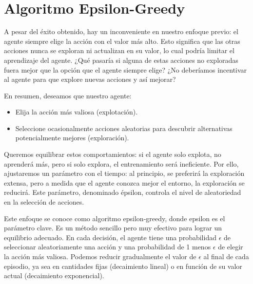 \documentclass{article}
\begin{document}
\vspace{1cm}

\section{Algoritmo Epsilon-Greedy}

\vspace{1cm}

A pesar del éxito obtenido, hay un inconveniente en nuestro enfoque previo: el agente siempre elige la acción con el valor más alto. Esto significa que las otras acciones nunca se exploran ni actualizan en su valor, lo cual podría limitar el aprendizaje del agente. ¿Qué pasaría si alguna de estas acciones no exploradas fuera mejor que la opción que el agente siempre elige? ¿No deberíamos incentivar al agente para que explore nuevas acciones y así mejorar?

\vspace{0.5cm}

En resumen, deseamos que nuestro agente:

\begin{itemize}
    \item Elija la acción más valiosa (explotación).
    \item Seleccione ocasionalmente acciones aleatorias para descubrir alternativas potencialmente mejores (exploración).
\end{itemize}

\vspace{0.5cm}

Queremos equilibrar estos comportamientos: si el agente solo explota, no aprenderá más, pero si solo explora, el entrenamiento será ineficiente. Por ello, ajustaremos un parámetro con el tiempo: al principio, se preferirá la exploración extensa, pero a medida que el agente conozca mejor el entorno, la exploración se reducirá. Este parámetro, denominado épsilon, controla el nivel de aleatoriedad en la selección de acciones.

\vspace{0.5cm}

Este enfoque se conoce como algoritmo epsilon-greedy, donde epsilon es el parámetro clave. Es un método sencillo pero muy efectivo para lograr un equilibrio adecuado. En cada decisión, el agente tiene una probabilidad $\epsilon$ de seleccionar aleatoriamente una acción y una probabilidad de 1 menos $\epsilon$ de elegir la acción más valiosa. Podemos reducir gradualmente el valor de $\epsilon$ al final de cada episodio, ya sea en cantidades fijas (decaimiento lineal) o en función de su valor actual (decaimiento exponencial).
\end{document}
